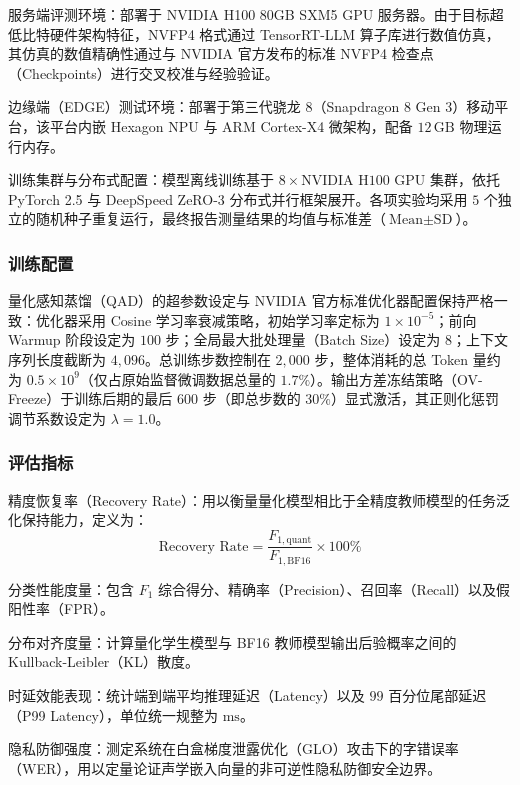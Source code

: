 \documentclass[11pt, a4paper]{article}
\begin{document}
{服务端评测环境}：部署于 NVIDIA H100 80GB SXM5 GPU 服务器。由于目标超低比特硬件架构特征，NVFP4 格式通过 TensorRT-LLM 算子库进行数值仿真，其仿真的数值精确性通过与 NVIDIA 官方发布的标准 NVFP4 检查点（Checkpoints）进行交叉校准与经验验证。
    
{边缘端（EDGE）测试环境}：部署于第三代骁龙 8（Snapdragon 8 Gen 3）移动平台，该平台内嵌 Hexagon NPU 与 ARM Cortex-X4 微架构，配备 $12\,\mathrm{GB}$ 物理运行内存。
    
{训练集群与分布式配置}：模型离线训练基于 $8 \times \text{NVIDIA H100}$ GPU 集群，依托 PyTorch 2.5 与 DeepSpeed ZeRO-3 分布式并行框架展开。各项实验均采用 $5$ 个独立的随机种子重复运行，最终报告测量结果的均值与标准差（$\text{Mean} \pm \text{SD}$）。


\subsubsection{训练配置}
量化感知蒸馏（QAD）的超参数设定与 NVIDIA 官方标准优化器配置保持严格一致：优化器采用 Cosine 学习率衰减策略，初始学习率定标为 $1 \times 10^{-5}$；前向 Warmup 阶段设定为 $100$ 步；全局最大批处理量（Batch Size）设定为 $8$；上下文序列长度截断为 $4,096$。总训练步数控制在 $2,000$ 步，整体消耗的总 Token 量约为 $0.5\times 10^9$（仅占原始监督微调数据总量的 $1.7\%$）。输出方差冻结策略（OV-Freeze）于训练后期的最后 $600$ 步（即总步数的 $30\%$）显式激活，其正则化惩罚调节系数设定为 $\lambda = 1.0$。

\subsubsection{评估指标}

   {精度恢复率（Recovery Rate）}：用以衡量量化模型相比于全精度教师模型的任务泛化保持能力，定义为：
    \begin{equation}
    \label{eq:recovery_rate}
        \text{Recovery Rate} = \frac{F_{1,\mathrm{quant}}}{F_{1,\mathrm{BF16}}} \times 100\%
    \end{equation}
    
    {分类性能度量}：包含 $F_1$ 综合得分、精确率（Precision）、召回率（Recall）以及假阳性率（FPR）。
    
    {分布对齐度量}：计算量化学生模型与 BF16 教师模型输出后验概率之间的 Kullback-Leibler（KL）散度。
    
    {时延效能表现}：统计端到端平均推理延迟（Latency）以及 $99$ 百分位尾部延迟（P99 Latency），单位统一规整为 $\mathrm{ms}$。
    
    {隐私防御强度}：测定系统在白盒梯度泄露优化（GLO）攻击下的字错误率（WER），用以定量论证声学嵌入向量的非可逆性隐私防御安全边界。
\end{document}
